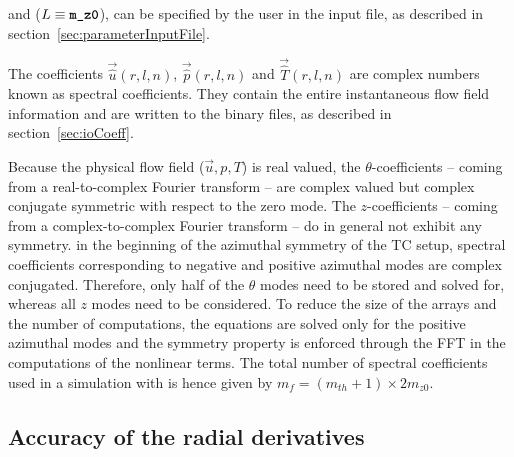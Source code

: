 \documentclass[a4paper, 11pt, DIV=11]{scrartcl}
\begin{document}
and ($L\equiv\textbf{\texttt{\color{black}m\_{z0}}}$), can be specified by the user in the 
input file, as described in section~\ref{sec:parameterInputFile}.
\par
The coefficients $\vec{\hat{u}}(r,l,n)$, $\vec{\hat{p}}(r,l,n)$ and
$\vec{\hat{T}}(r,l,n)$ are complex numbers known as spectral coefficients.
They contain the entire instantaneous flow field information and are
written to the binary  files, as described in
section~\ref{sec:ioCoeff}.
\par
Because the physical flow field ($\vec{u}, p, T$) is real valued,
the $\theta$-coefficients -- coming from a real-to-complex Fourier
transform -- are complex valued but complex conjugate symmetric with
respect to the zero mode. The $z$-coefficients -- coming from a
complex-to-complex Fourier transform -- do in general not exhibit any
symmetry.
in the beginning
of the azimuthal symmetry of the TC setup,
spectral coefficients corresponding to negative and positive azimuthal modes are
complex conjugated. Therefore, only half of the $\theta$ modes need to be stored
and solved for, whereas all $z$ modes need to be considered. To reduce the size
of the arrays and the number of computations, the equations are solved only for
the positive azimuthal modes and the symmetry property is enforced through the
FFT in the computations of the nonlinear terms. The total number of spectral
coefficients used in a simulation with \nsc is hence given by
$m_f = \left(m_{th}+1\right) \times 2m_{z0}$.


\subsection{Accuracy of the radial derivatives}
\label{sec:accuracyFD}
\end{document}
